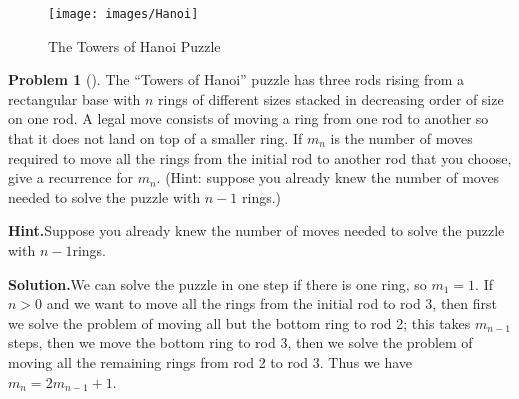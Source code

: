 \documentclass[10pt,]{book}
\theoremstyle{plain}
\theoremstyle{definition}
\newtheorem{activity}[project]{Problem}
\theoremstyle{definition}
\numberwithin{equation}{chapter}
\begin{document}
\begin{figure}
\centering
\texttt{[image: images/Hanoi]}
\caption{The Towers of Hanoi Puzzle\label{Hanoi}}
\end{figure}
\begin{activity}[]\label{HanoiProblem}
The ``Towers of Hanoi'' puzzle has three rods rising from a rectangular base with \(n\) rings of different sizes stacked in decreasing order of size on one rod. A legal move consists of moving a ring from one rod to another so that it does not land on top of a smaller ring. If \(m_n\) is the number of moves required to move all the rings from the initial rod to another rod that you choose, give a recurrence for \(m_n\). (Hint: suppose you already knew the number of moves needed to solve the puzzle with \(n-1\) rings.)%
\par\medskip\noindent%
\textbf{Hint.}\quad Suppose you already knew the number of moves needed to solve the puzzle with \(n-1\)rings.%
\par\medskip\noindent%
\textbf{Solution.}\quad We can solve the puzzle in one step if there is one ring, so \(m_1=1\). If \(n>0\) and we want to move all the rings from the initial rod to rod 3, then first we solve the problem of moving all but the bottom ring to rod 2; this takes \(m_{n-1}\) steps, then we move the bottom ring to rod 3, then we solve the problem of moving all the remaining rings from rod 2 to rod 3. Thus we have \(m_n=2m_{n-1}+1\).%
\end{activity}
\end{document}
